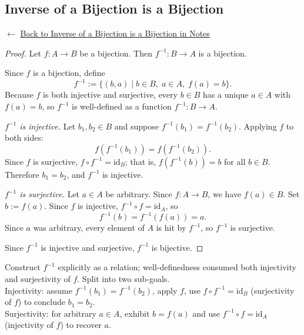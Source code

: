 \subsection*{Inverse of a Bijection is a Bijection}
\label{prf:inverse-bijection}
\begin{remark*}[Return]
$\leftarrow$ \hyperref[prop:inverse-bijection]{Back to Inverse of a Bijection is a Bijection in Notes}
\end{remark*}
\begin{proof}
\Claim Let $f : A \to B$ be a bijection. Then $f^{-1} : B \to A$ is a bijection.

Since $f$ is a bijection, define
\[
  f^{-1} := \{(b, a) \mid b \in B,\; a \in A,\; f(a) = b\}.
\]
Because $f$ is both injective and surjective, every $b \in B$ has a unique
$a \in A$ with $f(a) = b$, so $f^{-1}$ is well-defined as a function
$f^{-1} : B \to A$.

\medskip
\textit{$f^{-1}$ is injective.}
Let $b_1, b_2 \in B$ and suppose $f^{-1}(b_1) = f^{-1}(b_2)$. Applying $f$
to both sides:
\[
  f(f^{-1}(b_1)) = f(f^{-1}(b_2)).
\]
Since $f$ is surjective, $f \circ f^{-1} = \mathrm{id}_B$; that is,
$f(f^{-1}(b)) = b$ for all $b \in B$. Therefore $b_1 = b_2$, and
$f^{-1}$ is injective.

\medskip
\textit{$f^{-1}$ is surjective.}
Let $a \in A$ be arbitrary. Since $f : A \to B$, we have $f(a) \in B$.
Set $b := f(a)$. Since $f$ is injective, $f^{-1} \circ f = \mathrm{id}_A$,
so
\[
  f^{-1}(b) = f^{-1}(f(a)) = a.
\]
Since $a$ was arbitrary, every element of $A$ is hit by $f^{-1}$, so
$f^{-1}$ is surjective.

\medskip
Since $f^{-1}$ is injective and surjective, $f^{-1}$ is bijective.
\end{proof}
\begin{remark*}
Construct $f^{-1}$ explicitly as a relation; well-definedness consumed both
injectivity and surjectivity of $f$. Split into two sub-goals.\\
Injectivity: assume $f^{-1}(b_1) = f^{-1}(b_2)$, apply $f$, use
$f \circ f^{-1} = \mathrm{id}_B$ (surjectivity of $f$) to conclude $b_1 = b_2$.\\
Surjectivity: for arbitrary $a \in A$, exhibit $b = f(a)$ and use
$f^{-1} \circ f = \mathrm{id}_A$ (injectivity of $f$) to recover $a$.
\end{remark*}

